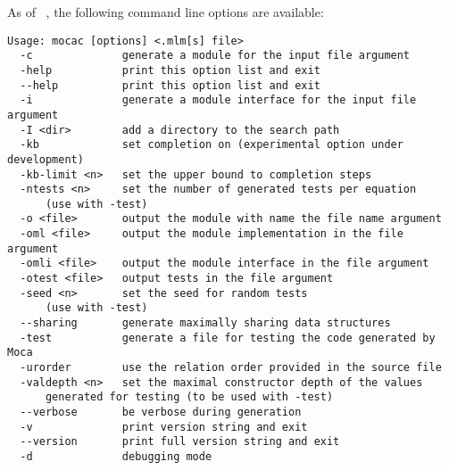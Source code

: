 As of \moca~\vnumber, the following command line options are available: 
\begin{verbatim}
Usage: mocac [options] <.mlm[s] file>
  -c              generate a module for the input file argument
  -help           print this option list and exit
  --help          print this option list and exit
  -i              generate a module interface for the input file argument
  -I <dir>        add a directory to the search path
  -kb             set completion on (experimental option under development)
  -kb-limit <n>   set the upper bound to completion steps
  -ntests <n>     set the number of generated tests per equation
      (use with -test)
  -o <file>       output the module with name the file name argument
  -oml <file>     output the module implementation in the file argument
  -omli <file>    output the module interface in the file argument
  -otest <file>   output tests in the file argument
  -seed <n>       set the seed for random tests
      (use with -test)
  --sharing       generate maximally sharing data structures
  -test           generate a file for testing the code generated by Moca
  -urorder        use the relation order provided in the source file
  -valdepth <n>   set the maximal constructor depth of the values 
      generated for testing (to be used with -test)
  --verbose       be verbose during generation
  -v              print version string and exit
  --version       print full version string and exit
  -d              debugging mode

\end{verbatim}
